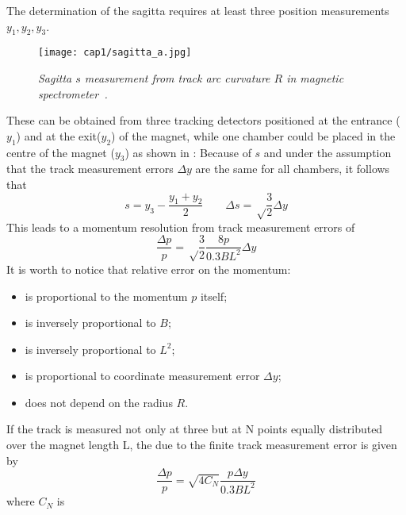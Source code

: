 The determination of the sagitta requires at least three position measurements
$y_{1}, y_{2}, y_{3}$.
\begin{figure}[!htbp]
  \centering\texttt{[image: cap1/sagitta\_a.jpg]}
  \caption{\textit{Sagitta $s$ measurement from track arc curvature $R$ in
      magnetic spectrometer~\cite{Grupen}.}}\label{sagitta_a}
\end{figure}
These can be obtained from three tracking detectors positioned at the entrance
($y_{1}$) and at the exit($y_{2}$) of the magnet, while one chamber could be
placed in the centre of the magnet ($y_{3}$) as shown in :
Because of $s$ and under the assumption that the track measurement errors
$\Delta y$ are the same for all chambers, it follows that
\begin{equation}
  s=y_{3}-\frac{y_{1}+y_{2}}{2}       \qquad    \Delta s=\sqrt\frac{3}{2}\Delta y
\end{equation}
This leads to a momentum resolution from track measurement errors of
\begin{equation}\label{err_p}
  \frac{\Delta p}{p}=\sqrt\frac{3}{2}\frac{8p}{0.3BL^2}\Delta y
\end{equation}
It is worth to notice that relative error on the momentum:
\begin{itemize}
\item is proportional to the momentum $p$ itself;
\item is inversely proportional to $B$;
\item is inversely proportional to $L^2$;
\item is proportional to coordinate measurement error $\Delta y$;
\item does not depend on the radius $R$.
\end{itemize}
If the track is measured not only at three but at N points equally distributed
over the magnet length L, the  due to the finite track measurement
error is given by
\begin{equation}\label{err_track}
  \frac{\Delta p}{p}=\sqrt{4C_{N}}\frac{p \Delta y}{0.3BL^2}
\end{equation}
where $C_{N}$ is

